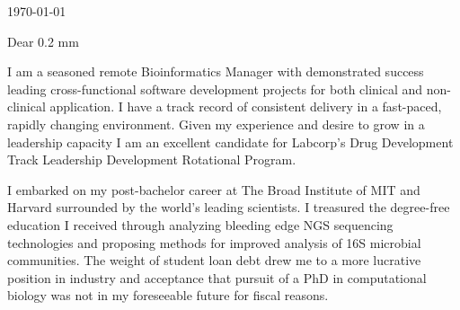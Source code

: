 \documentclass[10pt,letterpaper]{article}
\newcommand{\titleto}[1]{\renewcommand{\titleto}{#1}}
\newcommand{\nameto}[1]{\renewcommand{\nameto}{#1}}
\newcommand{\addrto}[1]{\renewcommand{\addrto}{#1}}
\begin{document}

\begin{flushright}

    \today
\end{flushright}


\nameto
\addrto


Dear \titleto \hspace{0.2 mm} \nameto,




I am a seasoned remote Bioinformatics Manager with demonstrated success leading cross-functional software development projects for both clinical and non-clinical application. I have a track record of consistent delivery in a fast-paced, rapidly changing environment. Given my experience and desire to grow in a leadership capacity I am an excellent candidate for Labcorp's Drug Development Track Leadership Development Rotational Program.

I embarked on my post-bachelor career at The Broad Institute of MIT and Harvard surrounded by the world's leading scientists. I treasured the degree-free education I received through analyzing bleeding edge NGS sequencing technologies and proposing methods for improved analysis of 16S microbial communities. The weight of student loan debt drew me to a more lucrative position in industry and acceptance that pursuit of a PhD in computational biology was not in my foreseeable future for fiscal reasons.
\end{document}
